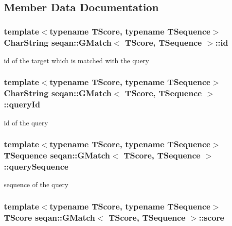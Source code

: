 \subsection{Member Data Documentation}
\hypertarget{structseqan_1_1_g_match_ae4eac560a806ad0771f1aea4106ffd0d}{
\subsubsection[{id}]{\setlength{\rightskip}{0pt plus 5cm}template$<$typename T\-Score, typename T\-Sequence$>$ Char\-String {\bf seqan\-::\-G\-Match}$<$ T\-Score, T\-Sequence $>$\-::id}}\label{structseqan_1_1_g_match_ae4eac560a806ad0771f1aea4106ffd0d}
id of the target which is matched with the query \hypertarget{structseqan_1_1_g_match_a49524158acebda7f2aa2711fa675fe5a}{
\subsubsection[{query\-Id}]{\setlength{\rightskip}{0pt plus 5cm}template$<$typename T\-Score, typename T\-Sequence$>$ Char\-String {\bf seqan\-::\-G\-Match}$<$ T\-Score, T\-Sequence $>$\-::query\-Id}}\label{structseqan_1_1_g_match_a49524158acebda7f2aa2711fa675fe5a}
id of the query \hypertarget{structseqan_1_1_g_match_a5bf1edefeece4584350a5d8b51bf5931}{
\subsubsection[{query\-Sequence}]{\setlength{\rightskip}{0pt plus 5cm}template$<$typename T\-Score, typename T\-Sequence$>$ T\-Sequence {\bf seqan\-::\-G\-Match}$<$ T\-Score, T\-Sequence $>$\-::query\-Sequence}}\label{structseqan_1_1_g_match_a5bf1edefeece4584350a5d8b51bf5931}
sequence of the query \hypertarget{structseqan_1_1_g_match_a167782c90ebf893b4ed14dec10751e2d}{
\subsubsection[{score}]{\setlength{\rightskip}{0pt plus 5cm}template$<$typename T\-Score, typename T\-Sequence$>$ T\-Score {\bf seqan\-::\-G\-Match}$<$ T\-Score, T\-Sequence $>$\-::score}}\label{structseqan_1_1_g_match_a167782c90ebf893b4ed14dec10751e2d}
